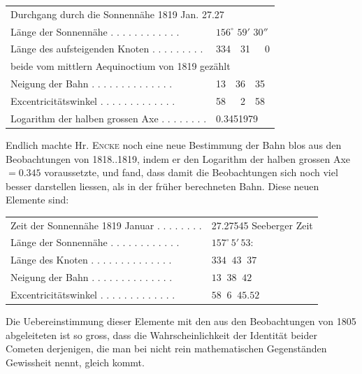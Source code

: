 \begin{center}
\begin{tabular}{l l}
\multicolumn{2}{l}{Durchgang durch die Sonnennähe 1819 Jan. 27.27} \\
Länge der Sonnennähe . . . . . . . . . . . . & $156^\circ$ $59'$ $30''$ \\
Länge des aufsteigenden Knoten . . . . . . . . . & 334\ \ 31\ \ \ 0 \\
\multicolumn{2}{l}{\quad beide vom mittlern Aequinoctium von 1819 gezählt} \\
Neigung der Bahn . . . . . . . . . . . . . . & 13\ \ 36\ \ 35 \\
Excentricitätswinkel . . . . . . . . . . . . . & 58\ \ \ 2\ \ 58 \\
Logarithm der halben grossen Axe . . . . . . . . & 0.3451979 \\
\end{tabular}
\end{center}

\par\indent Endlich machte Hr. \textsc{Encke} noch eine neue Bestimmung der Bahn blos aus den Beobachtungen
von 1818..1819, indem er den Logarithm der halben grossen Axe $= 0.345$ voraussetzte, und fand, dass
damit die Beobachtungen sich noch viel besser darstellen liessen, als in der früher berechneten Bahn.
Diese neuen Elemente sind:

\begin{center}
\begin{tabular}{l l}
Zeit der Sonnennähe 1819 Januar . . . . . . . . & 27.27545 Seeberger Zeit \\
Länge der Sonnennähe . . . . . . . . . . . . & $157^\circ\,5'\,53$: \\ 
Länge des Knoten . . . . . . . . . . . . . . & $334\;\;43\;\;37$ \\
Neigung der Bahn . . . . . . . . . . . . . . & $13\;\;38\;\;42$ \\
Excentricitätswinkel . . . . . . . . . . . . . & $58\;\;6\;\;45.52$ \\
\end{tabular}
\end{center}

\par\indent Die Uebereinstimmung dieser Elemente mit den aus den Beobachtungen von 1805 abgeleiteten ist
so gross, dass die Wahrscheinlichkeit der Identität beider Cometen derjenigen, die man bei nicht rein
mathematischen Gegenständen Gewissheit nennt, gleich kommt.

